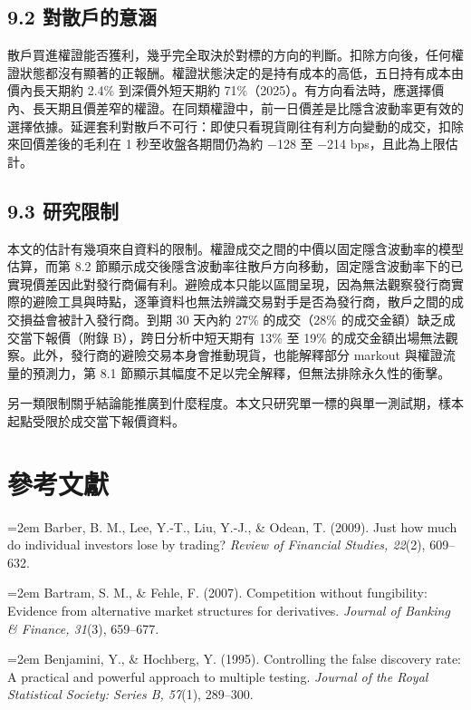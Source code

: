 \documentclass[12pt,a4paper]{article}
\begin{document}
\subsection*{9.2 對散戶的意涵}

散戶買進權證能否獲利，幾乎完全取決於對標的方向的判斷。扣除方向後，任何權證狀態都沒有顯著的正報酬。權證狀態決定的是持有成本的高低，五日持有成本由價內長天期約 2.4\% 到深價外短天期約 71\%（2025）。有方向看法時，應選擇價內、長天期且價差窄的權證。在同類權證中，前一日價差是比隱含波動率更有效的選擇依據。延遲套利對散戶不可行：即使只看現貨剛往有利方向變動的成交，扣除來回價差後的毛利在 1 秒至收盤各期間仍為約 −128 至 −214 bps，且此為上限估計。

\subsection*{9.3 研究限制}

本文的估計有幾項來自資料的限制。權證成交之間的中價以固定隱含波動率的模型估算，而第 8.2 節顯示成交後隱含波動率往散戶方向移動，固定隱含波動率下的已實現價差因此對發行商偏有利。避險成本只能以區間呈現，因為無法觀察發行商實際的避險工具與時點，逐筆資料也無法辨識交易對手是否為發行商，散戶之間的成交損益會被計入發行商。到期 30 天內約 27\% 的成交（28\% 的成交金額）缺乏成交當下報價（附錄 B），跨日分析中短天期有 13\% 至 19\% 的成交金額出場無法觀察。此外，發行商的避險交易本身會推動現貨，也能解釋部分 markout 與權證流量的預測力，第 8.1 節顯示其幅度不足以完全解釋，但無法排除永久性的衝擊。

另一類限制關乎結論能推廣到什麼程度。本文只研究單一標的與單一測試期，樣本起點受限於成交當下報價資料。


\section*{參考文獻}

\noindent\hangindent=2em Barber, B. M., Lee, Y.-T., Liu, Y.-J., \& Odean, T. (2009). Just how much do individual investors lose by trading? \textit{Review of Financial Studies, 22}(2), 609–632.\par

\noindent\hangindent=2em Bartram, S. M., \& Fehle, F. (2007). Competition without fungibility: Evidence from alternative market structures for derivatives. \textit{Journal of Banking \& Finance, 31}(3), 659–677.\par

\noindent\hangindent=2em Benjamini, Y., \& Hochberg, Y. (1995). Controlling the false discovery rate: A practical and powerful approach to multiple testing. \textit{Journal of the Royal Statistical Society: Series B, 57}(1), 289–300.\par
\end{document}
